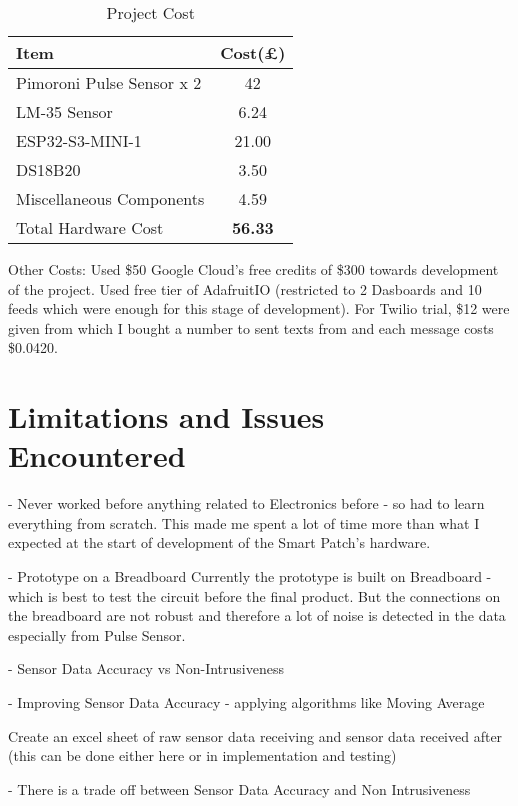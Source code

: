 \begin{table}[h!]
    \centering
    \begin{tabularx}{\textwidth}{|X|c|}
    \hline 
         \textbf{Item}& \textbf{Cost(£)}  \\ \hline
        Pimoroni Pulse Sensor x 2    &  42 \\ 
        LM-35 Sensor & 6.24 \\ 
        ESP32-S3-MINI-1 & 21.00 \\
        DS18B20 & 3.50 \\
        Miscellaneous Components & 4.59 \\ \hline
        Total Hardware Cost & \textbf{56.33} \\ \hline
        
    \end{tabularx}
    \caption{Project Cost}
    \label{tab:project-cost}
\end{table}

Other Costs:
Used \$50 Google Cloud's free credits of \$300 towards development of the project.
Used free tier of AdafruitIO (restricted to 2 Dasboards and 10 feeds which were enough for this stage of development). For Twilio trial, \$12 were given from which I bought a number to sent texts from and each message costs \$0.0420. 

\section{Limitations and Issues Encountered}

- Never worked before anything related to Electronics before - so had to learn everything from scratch. This made me spent a lot of time more than what I expected at the start of development of the Smart Patch's hardware. 

- Prototype on a Breadboard
Currently the prototype is built on Breadboard - which is best to test the circuit before the final product. But the connections on the breadboard are not robust and therefore a lot of noise is detected in the data especially from Pulse Sensor. 

- Sensor Data Accuracy vs Non-Intrusiveness

- Improving Sensor Data Accuracy - applying algorithms like Moving Average

Create an excel sheet of raw sensor data receiving and sensor data received after (this can be done either here or in implementation and testing)

-  There is a trade off between Sensor Data Accuracy and Non Intrusiveness

